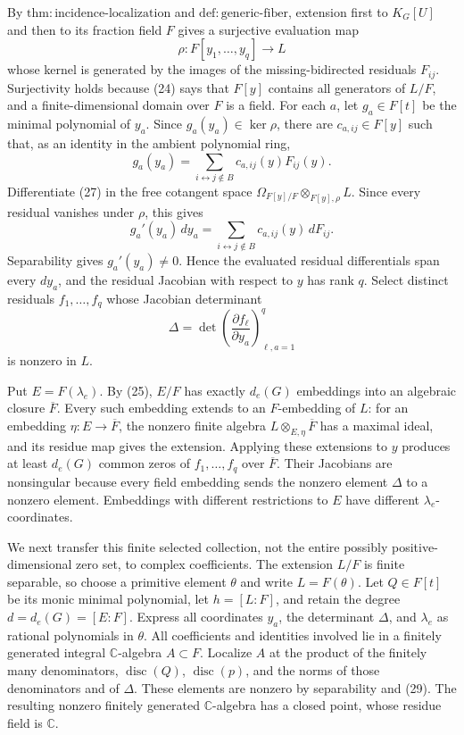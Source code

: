By \(\mathrm{thm:incidence\mbox{-}localization}\) and \(\mathrm{def:generic\mbox{-}fiber}\), extension first to \(K_G[U]\) and then to its fraction field \(F\) gives a surjective evaluation map
\[
 \rho:F[y_1,\ldots,y_q]\longrightarrow L
\tag{26}
\]
whose kernel is generated by the images of the missing-bidirected residuals \(F_{ij}\). Surjectivity holds because (24) says that \(F[y]\) contains all generators of \(L/F\), and a finite-dimensional domain over \(F\) is a field. For each \(a\), let \(g_a\in F[t]\) be the minimal polynomial of \(y_a\). Since \(g_a(y_a)\in\ker\rho\), there are \(c_{a,ij}\in F[y]\) such that, as an identity in the ambient polynomial ring,
\[
 g_a(y_a)=
 \sum_{i\leftrightarrow j\notin B}c_{a,ij}(y)F_{ij}(y).
\tag{27}
\]
Differentiate (27) in the free cotangent space \(\Omega_{F[y]/F}\otimes_{F[y],\rho}L\). Since every residual vanishes under \(\rho\), this gives
\[
 g_a'(y_a)\,dy_a
 =\sum_{i\leftrightarrow j\notin B}c_{a,ij}(y)\,dF_{ij}.
\tag{28}
\]
Separability gives \(g_a'(y_a)\ne0\). Hence the evaluated residual differentials span every \(dy_a\), and the residual Jacobian with respect to \(y\) has rank \(q\). Select distinct residuals \(f_1,\ldots,f_q\) whose Jacobian determinant
\[
 \Delta=\det\left(\frac{\partial f_\ell}{\partial y_a}\right)_{\ell,a=1}^{q}
\tag{29}
\]
is nonzero in \(L\).

Put \(E=F(\lambda_e)\). By (25), \(E/F\) has exactly \(d_e(G)\) embeddings into an algebraic closure \(\overline F\). Every such embedding extends to an \(F\)-embedding of \(L\): for an embedding \(\eta:E\to\overline F\), the nonzero finite algebra \(L\otimes_{E,\eta}\overline F\) has a maximal ideal, and its residue map gives the extension. Applying these extensions to \(y\) produces at least \(d_e(G)\) common zeros of \(f_1,\ldots,f_q\) over \(\overline F\). Their Jacobians are nonsingular because every field embedding sends the nonzero element \(\Delta\) to a nonzero element. Embeddings with different restrictions to \(E\) have different \(\lambda_e\)-coordinates.

We next transfer this finite selected collection, not the entire possibly positive-dimensional zero set, to complex coefficients. The extension \(L/F\) is finite separable, so choose a primitive element \(\theta\) and write \(L=F(\theta)\). Let \(Q\in F[t]\) be its monic minimal polynomial, let \(h=[L:F]\), and retain the degree \(d=d_e(G)=[E:F]\). Express all coordinates \(y_a\), the determinant \(\Delta\), and \(\lambda_e\) as rational polynomials in \(\theta\). All coefficients and identities involved lie in a finitely generated integral \(\mathbb C\)-algebra \(A\subset F\). Localize \(A\) at the product of the finitely many denominators, \(\operatorname{disc}(Q)\), \(\operatorname{disc}(p)\), and the norms of those denominators and of \(\Delta\). These elements are nonzero by separability and (29). The resulting nonzero finitely generated \(\mathbb C\)-algebra has a closed point, whose residue field is \(\mathbb C\).

